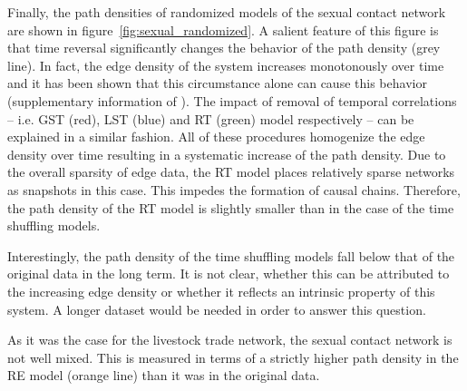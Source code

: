 Finally, the path densities of randomized models of the sexual contact network are shown in figure~\ref{fig:sexual_randomized}.
A salient feature of this figure is that time reversal significantly changes the behavior of the path density (grey line).
In fact, the edge density of the system increases monotonously over time and it has been shown that this circumstance alone can cause this behavior (supplementary information of \citet{Lentz:2013PRL}).
The impact of removal of temporal correlations -- i.e. GST (red), LST (blue) and RT (green) model respectively -- can be explained in a similar fashion.
All of these procedures homogenize the edge density over time resulting in a systematic increase of the path density.
Due to the overall sparsity of edge data, the RT model places relatively sparse networks as snapshots in this case.
This impedes the formation of causal chains.
Therefore, the path density of the RT model is slightly smaller than in the case of the time shuffling models.

Interestingly, the path density of the time shuffling models fall below that of the original data in the long term.
It is not clear, whether this can be attributed to the increasing edge density or whether it reflects an intrinsic property of this system.
A longer dataset would be needed in order to answer this question. 

As it was the case for the livestock trade network, the sexual contact network is not well mixed.
This is measured in terms of a strictly higher path density in the RE model (orange line) than it was in the original data.
